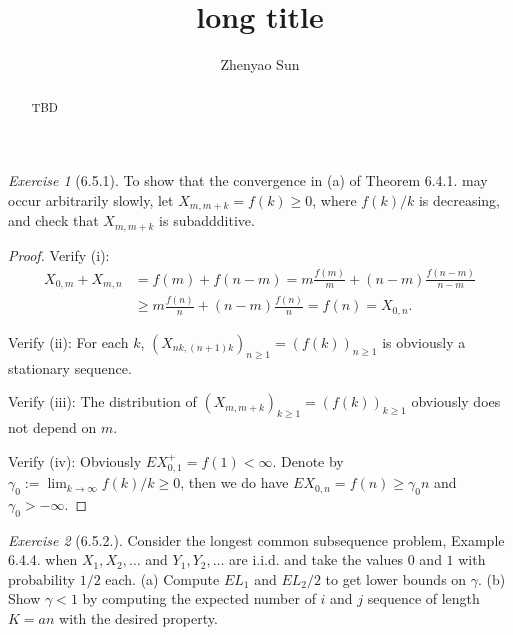 \documentclass[12pt,a4paper]{amsart}
\theoremstyle{plain}
\theoremstyle{definition}
\theoremstyle{remark}
\newtheorem*{exe}{Exercise}
\numberwithin{equation}{section}
\begin{document}
\title
[short title]
{long title}
\author
[Z. Sun]
{Zhenyao Sun}
\address
{Zhenyao Sun\\
School of Mathematical Sciences\\
Peking University\\
Beijing, P. R. China, 100871}
\begin{abstract}
  TBD
\end{abstract}
\maketitle
\begin{exe}[6.5.1]
To show that the convergence in (a) of Theorem 6.4.1. may occur arbitrarily slowly, let $X_{m,m+k}=f(k)\geq 0$, where $f(k)/k$ is decreasing, and check that $X_{m,m+k}$ is subaddditive.
\end{exe}
\begin{proof}
Verify (i): 
\begin{align}
X_{0,m}+X_{m,n} 
&= f(m) + f(n-m)
= m \frac{f(m)}{m} + (n-m)  \frac{f(n-m)}{n-m} 
\\&\geq m \frac{f(n)}{n} + (n-m) \frac{f(n)}{n}
= f(n) 
= X_{0,n}.
\end{align}

Verify (ii): For each $k$, $(X_{nk,(n+1)k})_{n\geq 1}= (f(k))_{n\geq 1}$ is obviously a stationary sequence.

Verify (iii): The distribution of $(X_{m,m+k})_{k\geq 1} = (f(k))_{k\geq 1}$ obviously does not depend on $m$.

Verify (iv): Obviously $EX_{0,1}^+=f(1)<\infty$. 
Denote by $\gamma_0 := \lim_{k\to \infty} f(k)/k \geq 0$, then we do have $EX_{0,n}= f(n)\geq \gamma_0 n$ and $\gamma_0 > -\infty$. 
\end{proof}
\begin{exe}[6.5.2.]
Consider the longest common subsequence problem, Example 6.4.4. when $X_1,X_2,\dots$ and $Y_1,Y_2,\dots$ are i.i.d. and take the values $0$ and $1$ with probability $1/2$ each.
(a) Compute $EL_1$ and $EL_2/2$ to get lower bounds on $\gamma$.
(b) Show $\gamma < 1$ by computing the expected number of $i$ and $j$ sequence of length $K=an$ with the desired property. 
\end{exe}
\end{document}
